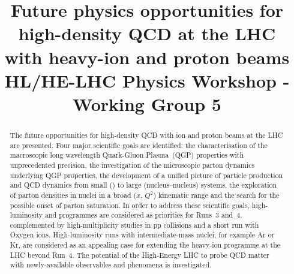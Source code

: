 \documentclass[11pt,twoside,a4paper]{cernrep}
\def\bibfiles{\main/bib/chapter,\main/introduction/bib/section,\main/schedule/bib/section,\main/hf/bib/section,\main/quarkonia/bib/section,\main/thermalradiation/bib/section,\main/flow/bib/section,\main/smallsystems/bib/section,\main/lightflavour/bib/section,\main/jets/bib/section,\main/smallx/bib/section,\main/beyond/bib/section,\main/helhc/bib/section,\main/accelerator/bib/section,\main/smallAexec/bib/section}
\providecommand{\biblio}{\clearpage}  %
\begin{document}
\newcommand{\main}{.}



\title{Future physics opportunities for high-density QCD at the LHC\\ with heavy-ion and proton beams \\
\vspace{5mm}
\small{HL/HE-LHC Physics Workshop - Working Group 5}}


\maketitle

\begin{abstract}
 The future opportunities for high-density QCD with ion and proton beams at the LHC are presented. Four major scientific goals are identified: the characterisation of the macroscopic long wavelength Quark-Gluon Plasma~(QGP) properties with unprecedented precision, the investigation of the microscopic parton dynamics underlying QGP properties, the development of a unified picture of particle production and QCD dynamics from small (\pp) to large (nucleus--nucleus) systems, the exploration of parton densities in nuclei in a broad ($x$, $Q^2$) kinematic range and the search for the possible onset of parton saturation. In order to address these scientific goals, high-luminosity \PbPb and \pPb programmes are considered as priorities for Runs~3 and~4, complemented by high-multiplicity studies in pp collisions and a  short run with Oxygen ions. High-luminosity runs with intermediate-mass nuclei, for example Ar or Kr, are considered as an appealing case for extending the heavy-ion programme at the LHC beyond Run~4. The potential of the High-Energy LHC to probe QCD matter with newly-available observables and phenomena is investigated.
\end{abstract}

\setcounter{tocdepth}{2}
{ 
\baselineskip=12pt
\tableofcontents
}
\clearpage


\clearpage

\clearpage

\clearpage

\clearpage

\clearpage

\clearpage

\clearpage

\clearpage

\clearpage

\clearpage

\clearpage

\clearpage

\clearpage



%
%
\footnotesize
\biblio
\end{document}
